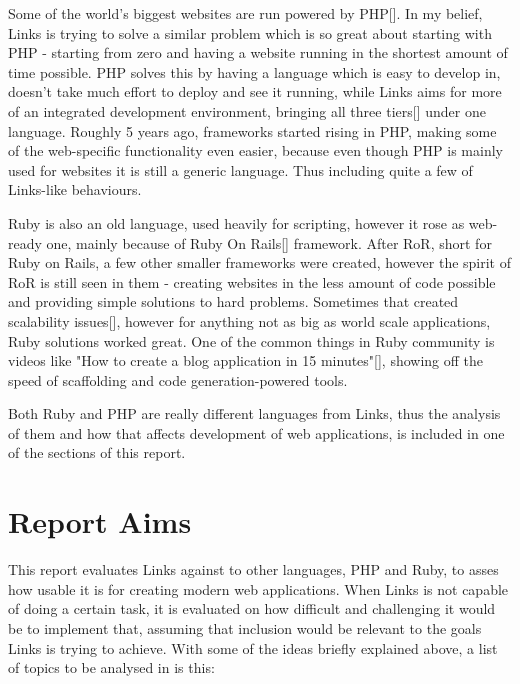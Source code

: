 Some of the world's biggest websites are run powered by PHP[]. In my belief, Links is trying to solve a similar problem which is so great about starting with PHP - starting from zero and having a website running in the shortest amount of time possible. PHP solves this by having a language which is easy to develop in, doesn't take much effort to deploy and see it running, while Links aims for more of an integrated development environment, bringing all three tiers[] under one language. Roughly 5 years ago, frameworks started rising in PHP, making some of the web-specific functionality even easier, because even though PHP is mainly used for websites it is still a generic language. Thus including quite a few of Links-like behaviours. 

Ruby is also an old language, used heavily for scripting, however it rose as web-ready one, mainly because of Ruby On Rails[] framework. After RoR, short for Ruby on Rails, a few other smaller frameworks were created, however the spirit of RoR is still seen in them - creating websites in the less amount of code possible and providing simple solutions to hard problems. Sometimes that created scalability issues[], however for anything not as big as world scale applications, Ruby solutions worked great. One of the common things in Ruby community is videos like "How to create a blog application in 15 minutes"[], showing off the speed of scaffolding and code generation-powered tools. 

Both Ruby and PHP are really different languages from Links, thus the analysis of them and how that affects development of web applications, is included in one of the sections of this report. 

\section{Report Aims}

This report evaluates Links against to other languages, PHP and Ruby, to asses how usable it is for creating modern web applications. When Links is not capable of doing a certain task, it is evaluated on how difficult and challenging it would be to implement that, assuming that inclusion would be relevant to the goals Links is trying to achieve. With some of the ideas briefly explained above, a list of topics to be analysed in is this:

